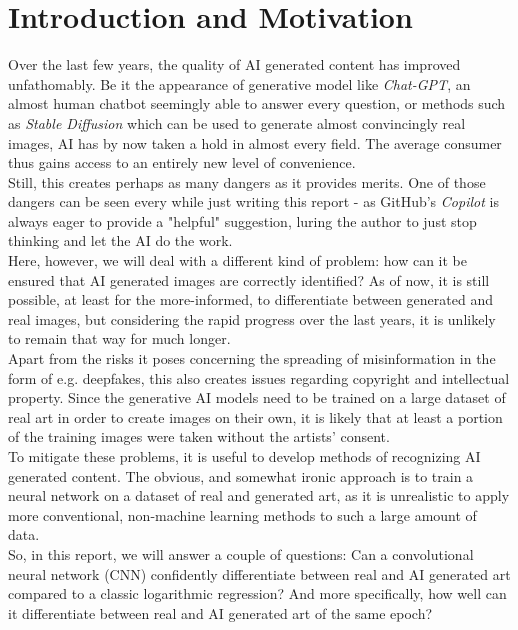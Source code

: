 \chapter{Introduction and Motivation}
\label{ch:intro}

Over the last few years, the quality of AI generated content has improved unfathomably.
Be it the appearance of generative model like \textit{Chat-GPT}, an almost human chatbot seemingly able to answer every question,
or methods such as \textit{Stable Diffusion} which can be used to generate almost convincingly real images, 
AI has by now taken a hold in almost every field. 
The average consumer thus gains access to an entirely new level of convenience. \\

Still, this creates perhaps as many dangers as it provides merits.
One of those dangers can be seen every while just writing this report - as GitHub's \textit{Copilot} is always eager to provide a "helpful" suggestion,
luring the author to just stop thinking and let the AI do the work. \\

Here, however, we will deal with a different kind of problem: how can it be ensured that AI generated images are correctly identified?
As of now, it is still possible, at least for the more-informed, to differentiate between generated and real images, but considering the rapid progress over the last years,
it is unlikely to remain that way for much longer. \\ %

Apart from the risks it poses concerning the spreading of misinformation in the form of e.g. deepfakes, this also creates issues regarding copyright and intellectual property.
Since the generative AI models need to be trained on a large dataset of real art in order to create images on their own, it is likely that at least a portion of the training images
were taken without the artists' consent. \\

To mitigate these problems, it is useful to develop methods of recognizing AI generated content.
The obvious, and somewhat ironic approach is to train a neural network on a dataset of real and generated art, 
as it is unrealistic to apply more conventional, non-machine learning methods to such a large amount of data. \\

So, in this report, we will answer a couple of questions: Can a convolutional neural network (CNN) confidently differentiate between real and AI generated art compared to a classic logarithmic regression?
And more specifically, how well can it differentiate between real and AI generated art of the same epoch? \\






